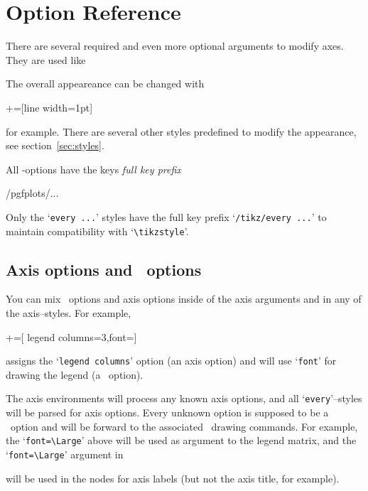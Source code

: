 \section{Option Reference}
There are several required and even more optional arguments to modify axes. They are used like
\begin{codeexample}
\end{codeexample}
The overall appeareance can be changed with
\begin{codeexample}
+=[line width=1pt]
\end{codeexample}
for example. There are several other styles predefined to modify the appearance, see section~\ref{sec:styles}.

All \PGFPlots-options have the {\PGF}keys \emph{full key prefix}
\begin{codeexample}
/pgfplots/...
\end{codeexample}
Only the `\texttt{every ...}' styles have the full key prefix `\texttt{/tikz/every ...}' to maintain compatibility with `\lstinline!\tikzstyle!'.


\subsection{Axis options and \Tikz\ options}
You can mix \Tikz\ options and axis options inside of the axis arguments and in any of the axis--styles. For example,
\begin{codeexample}
+=[
	legend columns=3,font=\Large]
\end{codeexample}
assigns the `\texttt{legend columns}' option (an axis option) and will use `\texttt{font}' for drawing the legend (a \Tikz\ option).

The axis environments will process any known axis options, and all `\texttt{every}'--styles will be parsed for axis options. Every unknown option is supposed to be a \Tikz\ option and will be forward to the associated \Tikz\ drawing commands. For example, the `\lstinline{font=\Large}' above will be used as argument to the legend matrix, and the `\lstinline{font=\Large}' argument in 
\begin{codeexample}[code only]
+=[
	ylabel=Error,xlabel=Dof,font=\Large}
\end{codeexample}
will be used in the nodes for axis labels (but not the axis title, for example).

